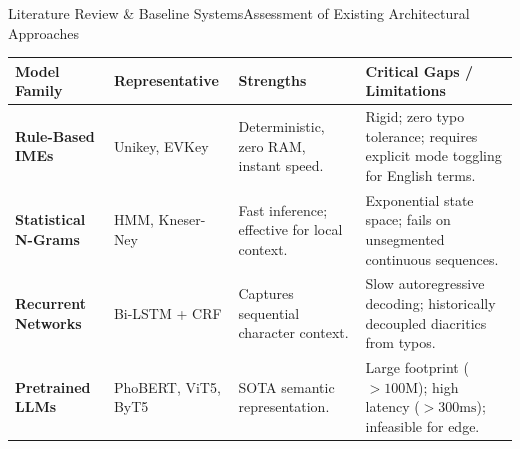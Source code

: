 \documentclass[aspectratio=169,10pt]{beamer}
\begin{document}
\begin{frame}{Literature Review \& Baseline Systems}{Assessment of Existing Architectural Approaches}
  \begin{table}[H]
    \centering
    \scriptsize
    \renewcommand{\arraystretch}{1.2}
    \begin{tabularx}{\textwidth}{p{2.6cm} p{2.6cm} p{3.8cm} p{4.2cm}}
      \toprule
      \textbf{Model Family} & \textbf{Representative} & \textbf{Strengths} & \textbf{Critical Gaps / Limitations} \\
      \midrule
      \textbf{Rule-Based IMEs} & Unikey, EVKey & Deterministic, zero RAM, instant speed. & Rigid; zero typo tolerance; requires explicit mode toggling for English terms. \\
      \addlinespace
      \textbf{Statistical N-Grams} & HMM, Kneser-Ney & Fast inference; effective for local context. & Exponential state space; fails on unsegmented continuous sequences. \\
      \addlinespace
      \textbf{Recurrent Networks} & Bi-LSTM + CRF & Captures sequential character context. & Slow autoregressive decoding; historically decoupled diacritics from typos. \\
      \addlinespace
      \textbf{Pretrained LLMs} & PhoBERT, ViT5, ByT5 & SOTA semantic representation. & Large footprint ($>100\text{M}$); high latency ($>300\text{ms}$); infeasible for edge. \\
      \bottomrule
    \end{tabularx}
  \end{table}
\end{frame}
\end{document}
